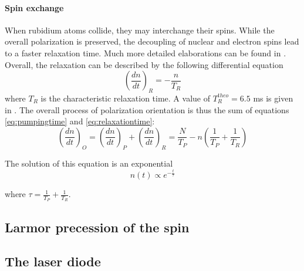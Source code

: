 \paragraph{Spin exchange}
When rubidium atoms collide, they may interchange their spins. While the overall polarization is preserved, the decoupling of nuclear and electron spins lead to a faster relaxation time. Much more detailed elaborations can be found in \cite{happer}.\\

Overall, the relaxation can be described by the following differential equation
\begin{equation}
\left(\frac{dn}{dt}\right)_R=-\frac{n}{T_R}
\label{eq:relaxationtime}
\end{equation}
where $T_R$ is the characteristic relaxation time. A value of $T^{theo}_R=6.5$ ms is given in \cite{staatsex}. The overall process of polarization orientation is thus the sum of equations \ref{eq:pumpingtime} and \ref{eq:relaxationtime}:
\begin{equation}
\left(\frac{dn}{dt}\right)_O=\left(\frac{dn}{dt}\right)_P+\left(\frac{dn}{dt}\right)_R=\frac{N}{T_P}-n\left(\frac{1}{T_P}+\frac{1}{T_R}\right)
\end{equation}

The solution of this equation is an exponential
\begin{equation}
n(t)\propto e^{-\frac{t}{\tau}}
\label{eq:orientationexponential}
\end{equation}

where $\tau=\frac{1}{T_P}+\frac{1}{T_R}$.
\subsection{Larmor precession of the spin}

\subsection{The laser diode}
